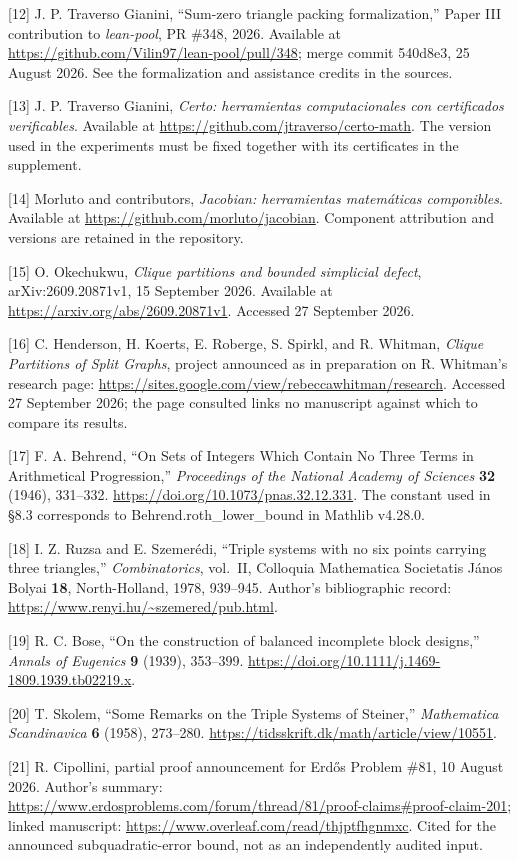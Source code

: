 \documentclass[english,11pt,a4paper]{article}
\begin{document}
{[}12{]} J. P. Traverso Gianini, ``Sum-zero triangle packing formalization,'' Paper III contribution to \emph{lean-pool}, PR \#348, 2026. Available at \url{https://github.com/Vilin97/lean-pool/pull/348}; merge commit {\ttfamily\small 540d8e3}, 25 August 2026. See the formalization and assistance credits in the sources.

{[}13{]} J. P. Traverso Gianini, \emph{Certo: herramientas computacionales con certificados verificables}. Available at \url{https://github.com/jtraverso/certo-math}. The version used in the experiments must be fixed together with its certificates in the supplement.

{[}14{]} Morluto and contributors, \emph{Jacobian: herramientas matemáticas componibles}. Available at \url{https://github.com/morluto/jacobian}. Component attribution and versions are retained in the repository.

{[}15{]} O. Okechukwu, \emph{Clique partitions and bounded simplicial defect}, arXiv:2609.20871v1, 15 September 2026. Available at \url{https://arxiv.org/abs/2609.20871v1}. Accessed 27 September 2026.

{[}16{]} C. Henderson, H. Koerts, E. Roberge, S. Spirkl, and R. Whitman, \emph{Clique Partitions of Split Graphs}, project announced as in preparation on R. Whitman's research page: \url{https://sites.google.com/view/rebeccawhitman/research}. Accessed 27 September 2026; the page consulted links no manuscript against which to compare its results.

{[}17{]} F. A. Behrend, ``On Sets of Integers Which Contain No Three Terms in Arithmetical Progression,'' \emph{Proceedings of the National Academy of Sciences} \textbf{32} (1946), 331--332. \url{https://doi.org/10.1073/pnas.32.12.331}. The constant used in §8.3 corresponds to {\ttfamily\small Behrend.\discretionary{\hbox{\ensuremath{\hookrightarrow}}}{}{}roth\_\discretionary{\hbox{\ensuremath{\hookrightarrow}}}{}{}lower\_\discretionary{\hbox{\ensuremath{\hookrightarrow}}}{}{}bound} in Mathlib v4.28.0.

{[}18{]} I. Z. Ruzsa and E. Szemerédi, ``Triple systems with no six points carrying three triangles,'' \emph{Combinatorics}, vol.~II, Colloquia Mathematica Societatis János Bolyai \textbf{18}, North-Holland, 1978, 939--945. Author's bibliographic record: \url{https://www.renyi.hu/~szemered/pub.html}.

{[}19{]} R. C. Bose, ``On the construction of balanced incomplete block designs,'' \emph{Annals of Eugenics} \textbf{9} (1939), 353--399. \url{https://doi.org/10.1111/j.1469-1809.1939.tb02219.x}.

{[}20{]} T. Skolem, ``Some Remarks on the Triple Systems of Steiner,'' \emph{Mathematica Scandinavica} \textbf{6} (1958), 273--280. \url{https://tidsskrift.dk/math/article/view/10551}.

{[}21{]} R. Cipollini, partial proof announcement for Erdős Problem \#81, 10 August 2026. Author's summary: \url{https://www.erdosproblems.com/forum/thread/81/proof-claims\#proof-claim-201}; linked manuscript: \url{https://www.overleaf.com/read/thjptfhgnmxc}. Cited for the announced subquadratic-error bound, not as an independently audited input.

\endgroup
\end{document}
